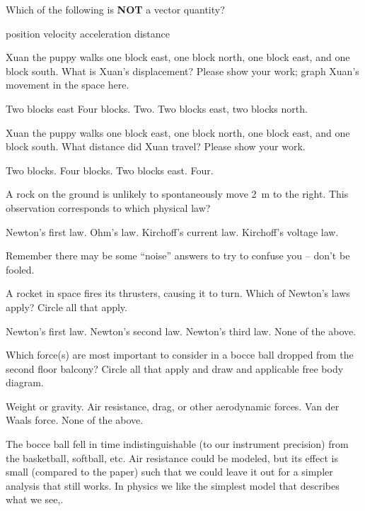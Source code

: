 \documentclass[exam,addpoints, answers]{exam}
\begin{document}
\begin{questions}
\question[1] Which of the following is \textbf{NOT} a vector quantity?
\begin{choices}
\choice position
\choice velocity
\choice acceleration
\CorrectChoice distance
\end{choices}

\question[1] Xuan the puppy walks one block east, one block north, one block east, and one block south. What is Xuan's displacement? Please show your work; graph Xuan's movement in the space here. 
\begin{choices}
\CorrectChoice Two blocks east
\choice Four blocks.
\choice Two.
\choice Two blocks east, two blocks north. 
\end{choices}

\question[1] Xuan the puppy walks one block east, one block north, one block east, and one block south. What distance did Xuan travel? Please show your work. 
\begin{choices}
\choice Two blocks.
\CorrectChoice Four blocks.
\choice Two blocks east.
\choice Four. 
\end{choices}

\question[1] A rock on the ground is unlikely to spontaneously move \SI{2}{\meter} to the right. This observation corresponds to which physical law? 
\begin{choices}
\CorrectChoice Newton's first law.
\choice Ohm's law. 
\choice Kirchoff's current law. 
\choice Kirchoff's voltage law. 
\end{choices}
\begin{solution}
Remember there may be some ``noise'' answers to try to confuse you -- don't be fooled. 
\end{solution}

\question[1] A rocket in space fires its thrusters, causing it to turn. Which of Newton's laws apply?  Circle all that apply. 
\begin{choices}
\CorrectChoice Newton's first law. 
\CorrectChoice Newton's second law.
\CorrectChoice Newton's third law. 
\choice None of the above.
\end{choices}




\clearpage
\question[1] Which force(s) are most important to consider in a bocce ball dropped from the second floor balcony? Circle all that apply and draw and applicable free body diagram. 
\begin{choices}
\CorrectChoice Weight or gravity. 
\choice Air resistance, drag, or other aerodynamic forces. 
\choice Van der Waals force. 
\choice None of the above.
\end{choices}
\begin{solution}
The bocce ball fell in time indistinguishable (to our instrument precision) from the basketball, softball, etc. Air resistance could be modeled, but its effect is small (compared to the paper) such that we could leave it out for a simpler analysis that still works. In physics we like the simplest model that describes what we see,. 
\end{solution}


\end{questions}
\end{document}
